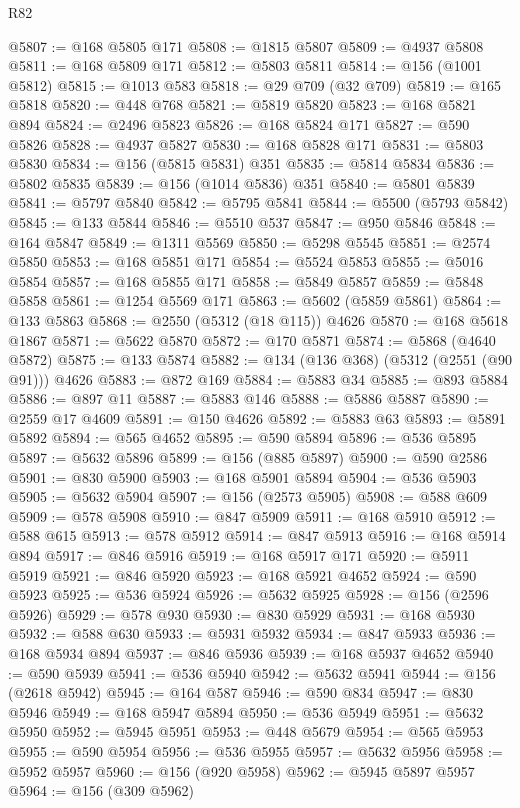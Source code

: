 \begin{lexlean}{R82}
\begin{coremodule}
@5807 := @168 @5805 @171
@5808 := @1815 @5807
@5809 := @4937 @5808
@5811 := @168 @5809 @171
@5812 := @5803 @5811
@5814 := @156 (@1001 @5812)
@5815 := @1013 @583
@5818 := @29 @709 (@32 @709)
@5819 := @165 @5818
@5820 := @448 @768
@5821 := @5819 @5820
@5823 := @168 @5821 @894
@5824 := @2496 @5823
@5826 := @168 @5824 @171
@5827 := @590 @5826
@5828 := @4937 @5827
@5830 := @168 @5828 @171
@5831 := @5803 @5830
@5834 := @156 (@5815 @5831) @351
@5835 := @5814 @5834
@5836 := @5802 @5835
@5839 := @156 (@1014 @5836) @351
@5840 := @5801 @5839
@5841 := @5797 @5840
@5842 := @5795 @5841
@5844 := @5500 (@5793 @5842)
@5845 := @133 @5844
@5846 := @5510 @537
@5847 := @950 @5846
@5848 := @164 @5847
@5849 := @1311 @5569
@5850 := @5298 @5545
@5851 := @2574 @5850
@5853 := @168 @5851 @171
@5854 := @5524 @5853
@5855 := @5016 @5854
@5857 := @168 @5855 @171
@5858 := @5849 @5857
@5859 := @5848 @5858
@5861 := @1254 @5569 @171
@5863 := @5602 (@5859 @5861)
@5864 := @133 @5863
@5868 := @2550 (@5312 (@18 @115)) @4626
@5870 := @168 @5618 @1867
@5871 := @5622 @5870
@5872 := @170 @5871
@5874 := @5868 (@4640 @5872)
@5875 := @133 @5874
@5882 := @134 (@136 @368) (@5312 (@2551 (@90 @91))) @4626
@5883 := @872 @169
@5884 := @5883 @34
@5885 := @893 @5884
@5886 := @897 @11
@5887 := @5883 @146
@5888 := @5886 @5887
@5890 := @2559 @17 @4609
@5891 := @150 @4626
@5892 := @5883 @63
@5893 := @5891 @5892
@5894 := @565 @4652
@5895 := @590 @5894
@5896 := @536 @5895
@5897 := @5632 @5896
@5899 := @156 (@885 @5897)
@5900 := @590 @2586
@5901 := @830 @5900
@5903 := @168 @5901 @5894
@5904 := @536 @5903
@5905 := @5632 @5904
@5907 := @156 (@2573 @5905)
@5908 := @588 @609
@5909 := @578 @5908
@5910 := @847 @5909
@5911 := @168 @5910
@5912 := @588 @615
@5913 := @578 @5912
@5914 := @847 @5913
@5916 := @168 @5914 @894
@5917 := @846 @5916
@5919 := @168 @5917 @171
@5920 := @5911 @5919
@5921 := @846 @5920
@5923 := @168 @5921 @4652
@5924 := @590 @5923
@5925 := @536 @5924
@5926 := @5632 @5925
@5928 := @156 (@2596 @5926)
@5929 := @578 @930
@5930 := @830 @5929
@5931 := @168 @5930
@5932 := @588 @630
@5933 := @5931 @5932
@5934 := @847 @5933
@5936 := @168 @5934 @894
@5937 := @846 @5936
@5939 := @168 @5937 @4652
@5940 := @590 @5939
@5941 := @536 @5940
@5942 := @5632 @5941
@5944 := @156 (@2618 @5942)
@5945 := @164 @587
@5946 := @590 @834
@5947 := @830 @5946
@5949 := @168 @5947 @5894
@5950 := @536 @5949
@5951 := @5632 @5950
@5952 := @5945 @5951
@5953 := @448 @5679
@5954 := @565 @5953
@5955 := @590 @5954
@5956 := @536 @5955
@5957 := @5632 @5956
@5958 := @5952 @5957
@5960 := @156 (@920 @5958)
@5962 := @5945 @5897 @5957
@5964 := @156 (@309 @5962)

\end{coremodule}
\end{lexlean}
